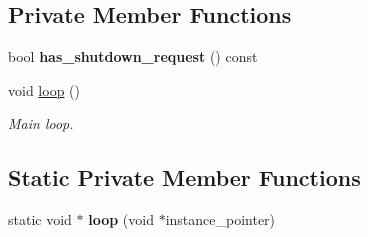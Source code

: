 \subsection*{Private Member Functions}
\begin{DoxyCompactItemize}
\item 
bool {\bfseries has\+\_\+shutdown\+\_\+request} () const \hypertarget{classrobot__interfaces_1_1RobotBackend_afb4058468e7cc59dae5801eb5e369613}{}\label{classrobot__interfaces_1_1RobotBackend_afb4058468e7cc59dae5801eb5e369613}

\item 
void \hyperlink{classrobot__interfaces_1_1RobotBackend_a7cc66183743f277c41614a44fcc47b1a}{loop} ()
\begin{DoxyCompactList}\small\item\em Main loop. \end{DoxyCompactList}\end{DoxyCompactItemize}
\subsection*{Static Private Member Functions}
\begin{DoxyCompactItemize}
\item 
static void $\ast$ {\bfseries loop} (void $\ast$instance\+\_\+pointer)\hypertarget{classrobot__interfaces_1_1RobotBackend_a44f21ab5414ea7742e34a3cf3dfe0650}{}\label{classrobot__interfaces_1_1RobotBackend_a44f21ab5414ea7742e34a3cf3dfe0650}

\end{DoxyCompactItemize}
